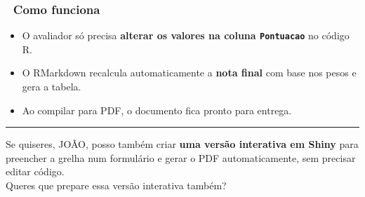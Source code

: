 \documentclass[
]{article}
\providecommand{\tightlist}{%
  \setlength{\itemsep}{0pt}\setlength{\parskip}{0pt}}
\begin{document}
\subsubsection{🔹 Como funciona}\label{como-funciona}

\begin{itemize}
\tightlist
\item
  O avaliador só precisa \textbf{alterar os valores na coluna
  \texttt{Pontuacao}} no código R.
\item
  O RMarkdown recalcula automaticamente a \textbf{nota final} com base
  nos pesos e gera a tabela.
\item
  Ao compilar para PDF, o documento fica pronto para entrega.
\end{itemize}

\begin{center}\rule{0.5\linewidth}{0.5pt}\end{center}

Se quiseres, JOÃO, posso também criar \textbf{uma versão interativa em
Shiny} para preencher a grelha num formulário e gerar o PDF
automaticamente, sem precisar editar código.\\
Queres que prepare essa versão interativa também?
\end{document}
